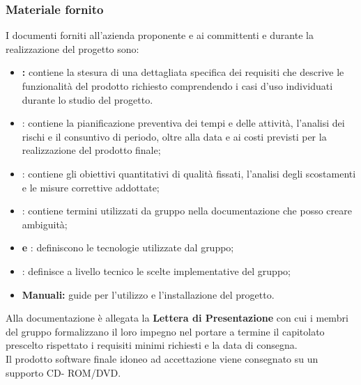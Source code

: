 \subsubsection{Materiale fornito} 
I documenti forniti all'azienda proponente e ai committenti \VT e \CR durante la realizzazione del progetto sono:
\begin{itemize}
	\item \textbf{\AdR:} contiene la stesura di una dettagliata specifica dei requisiti che descrive le funzionalità del prodotto richiesto comprendendo i casi d'uso individuati durante lo studio del progetto.
	\item \textbf{\PdP}: contiene la pianificazione preventiva dei tempi e delle attività, l’analisi dei rischi e il consuntivo di periodo, oltre alla data e ai costi previsti per la realizzazione del prodotto finale;
	\item \textbf{\PdQ}: contiene gli obiettivi quantitativi di qualità fissati, l'analisi degli scostamenti e le misure correttive addottate;
	\item \textbf{\Glossario}: contiene termini utilizzati da gruppo nella documentazione che posso creare ambiguità;
	\item \textbf{ e }: definiscono le tecnologie utilizzate dal gruppo;
	\item \textbf{}: definisce a livello tecnico le scelte implementative del gruppo;
	\item \textbf{Manuali:} guide per l'utilizzo e l'installazione del progetto.
\end{itemize}
Alla documentazione è allegata la \textbf{Lettera di Presentazione} con cui i membri del gruppo \Gruppo formalizzano il loro impegno nel portare a termine il capitolato prescelto rispettato i requisiti minimi richiesti e la data di consegna. \\
Il prodotto software finale idoneo ad accettazione viene consegnato su un supporto CD- ROM/DVD.

